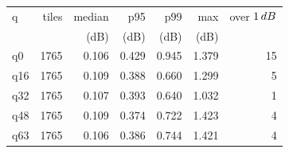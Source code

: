 \begin{tabular}{lrrrrrr}
\toprule
q & tiles & median & p95 & p99 & max & over $1\,dB$ \\
 &  & (dB) & (dB) & (dB) & (dB) &  \\
\midrule
q0 & 1765 & 0.106 & 0.429 & 0.945 & 1.379 & 15 \\
q16 & 1765 & 0.109 & 0.388 & 0.660 & 1.299 & 5 \\
q32 & 1765 & 0.107 & 0.393 & 0.640 & 1.032 & 1 \\
q48 & 1765 & 0.109 & 0.374 & 0.722 & 1.423 & 4 \\
q63 & 1765 & 0.106 & 0.386 & 0.744 & 1.421 & 4 \\
\bottomrule
\end{tabular}
